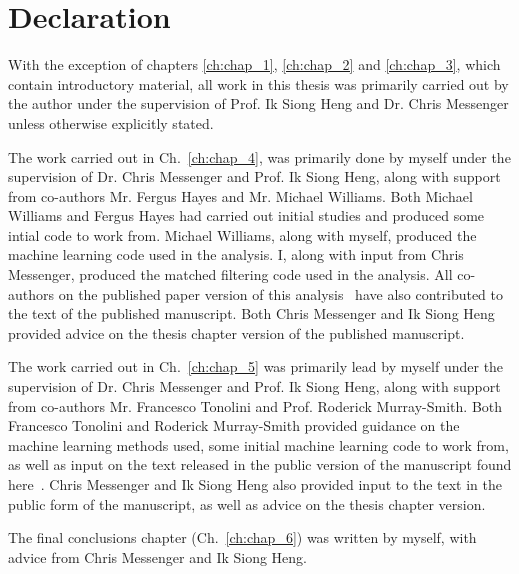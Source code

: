 \chapter{Declaration}

With the exception of chapters \ref{ch:chap_1}, \ref{ch:chap_2} and \ref{ch:chap_3}, which contain introductory material, 
all work in this thesis was primarily carried out by the author under the supervision
of Prof. Ik Siong Heng and Dr. Chris Messenger unless otherwise explicitly stated. 

The work carried out in Ch.~\ref{ch:chap_4}, was primarily 
done by myself under the supervision of Dr. Chris Messenger 
and Prof. Ik Siong Heng, along with support from co-authors 
Mr. Fergus Hayes and Mr. Michael Williams. Both Michael Williams 
and Fergus Hayes had carried out initial studies and produced some 
intial code to work from. Michael Williams, along with myself, 
produced the machine learning code used in the analysis. I, along with input from 
Chris Messenger, produced the matched filtering code used in the 
analysis. All co-authors 
on the published paper version of this analysis~\cite{PhysRevLett.120.141103} 
have also contributed to the text of the published manuscript. 
Both Chris Messenger and Ik Siong Heng provided advice 
on the thesis chapter version of the published manuscript.

The work carried out in Ch.~\ref{ch:chap_5} was primarily 
lead by myself under the supervision of Dr. Chris Messenger 
and Prof. Ik Siong Heng, along with support from co-authors 
Mr. Francesco Tonolini and Prof. Roderick Murray-Smith. Both 
Francesco Tonolini and Roderick Murray-Smith provided guidance 
on the machine learning methods used, some initial machine learning code to work from, 
as well as input 
on the text released in the public version of the manuscript
found here~\cite{1909.06296}. Chris Messenger and Ik Siong Heng also provided 
input to the text in the public form of the manuscript, as well as advice on 
the thesis chapter version.

The final conclusions chapter (Ch.~\ref{ch:chap_6}) was written by myself, with advice 
from Chris Messenger and Ik Siong Heng.
